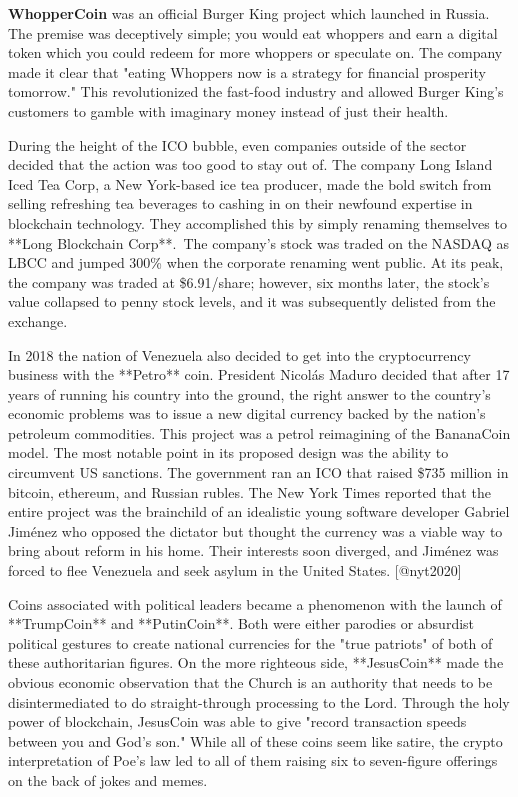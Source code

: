
\textbf{WhopperCoin} was an official Burger King project which launched in
Russia. The premise was deceptively simple; you would eat whoppers and earn a
digital token which you could redeem for more whoppers or speculate on. The
company made it clear that "eating Whoppers now is a strategy for financial
prosperity tomorrow." This revolutionized the fast-food industry and allowed
Burger King's customers to gamble with imaginary money instead of just their
health.

During the height of the ICO bubble, even companies outside of the sector
decided that the action was too good to stay out of. The company Long Island
Iced Tea Corp, a New York-based ice tea producer, made the bold switch from
selling refreshing tea beverages to cashing in on their newfound expertise in
blockchain technology. They accomplished this by simply renaming themselves to
**Long Blockchain Corp**. The company's stock was traded on the NASDAQ as LBCC
and jumped 300\% when the corporate renaming went public. At its peak, the
company was traded at \$6.91/share; however, six months later, the stock's value
collapsed to penny stock levels, and it was subsequently delisted from the
exchange.


In 2018 the nation of Venezuela also decided to get into the cryptocurrency
business with the **Petro** coin. President Nicolás Maduro decided that after 17
years of running his country into the ground, the right answer to the country's
economic problems was to issue a new digital currency backed by the nation's
petroleum commodities. This project was a petrol reimagining of the BananaCoin
model. The most notable point in its proposed design was the ability to
circumvent US sanctions. The government ran an ICO that raised \$735 million in
bitcoin, ethereum, and Russian rubles. The New York Times reported that the
entire project was the brainchild of an idealistic young software developer
Gabriel Jiménez who opposed the dictator but thought the currency was a viable
way to bring about reform in his home. Their interests soon diverged, and
Jiménez was forced to flee Venezuela and seek asylum in the United States.
[@nyt2020] \cite{nyt2020}



Coins associated with political leaders became a phenomenon with the launch of
**TrumpCoin** and **PutinCoin**. Both were either parodies or absurdist
political gestures to create national currencies for the "true patriots" of both
of these authoritarian figures. On the more righteous side, **JesusCoin** made
the obvious economic observation that the Church is an authority that needs to
be disintermediated to do straight-through processing to the Lord. Through the
holy power of blockchain, JesusCoin was able to give "record transaction speeds
between you and God's son." While all of these coins seem like satire, the
crypto interpretation of Poe's law led to all of them raising six to
seven-figure offerings on the back of jokes and memes.

